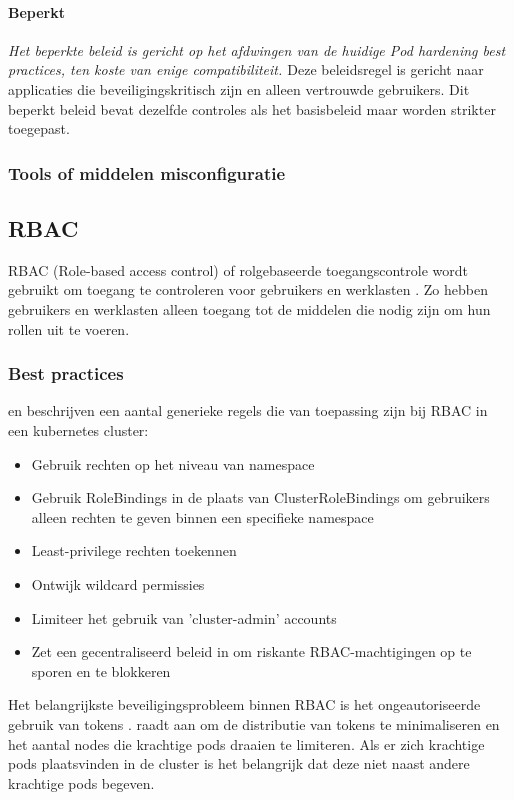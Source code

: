 \paragraph{Beperkt}
\textit{Het beperkte beleid is gericht op het afdwingen van de huidige Pod hardening best practices, ten koste van enige compatibiliteit. \autocite{KubernetesDocs-2023}}
Deze beleidsregel is gericht naar applicaties die beveiligingskritisch zijn en alleen vertrouwde gebruikers. 
Dit beperkt beleid bevat dezelfde controles als het basisbeleid maar worden strikter toegepast.

\subsubsection{Tools of middelen misconfiguratie}


\subsection{RBAC}
RBAC (Role-based access control) of rolgebaseerde toegangscontrole wordt gebruikt om toegang te controleren voor gebruikers en werklasten \autocite{nordell2022systematic}.
Zo hebben gebruikers en werklasten alleen toegang tot de middelen die nodig zijn om hun rollen uit te voeren.

\subsubsection{Best practices}
\textcite{KubernetesDocs-2023} en \textcite{OWASP-2023} beschrijven een aantal generieke regels die van toepassing zijn bij RBAC in een kubernetes cluster:
\begin{itemize}
    \item Gebruik rechten op het niveau van namespace
    \item Gebruik RoleBindings in de plaats van ClusterRoleBindings om gebruikers alleen rechten te geven binnen een specifieke namespace
    \item Least-privilege rechten toekennen
    \item Ontwijk wildcard permissies
    \item Limiteer het gebruik van 'cluster-admin' accounts
    \item Zet een gecentraliseerd beleid in om riskante RBAC-machtigingen op te sporen en te blokkeren
\end{itemize}

Het belangrijkste beveiligingsprobleem binnen RBAC is het ongeautoriseerde gebruik van tokens  \autocite{nordell2022systematic}.  \textcite{KubernetesDocs-2023} raadt aan om de distributie van tokens te minimaliseren en het aantal nodes die krachtige pods draaien te limiteren. Als er zich krachtige pods plaatsvinden in de cluster is het belangrijk dat deze niet naast andere krachtige pods begeven. 

